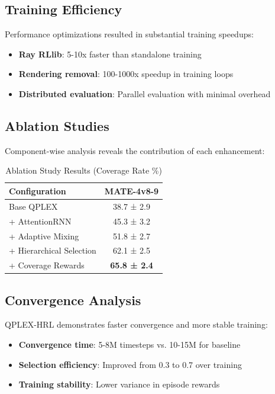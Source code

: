 \documentclass[conference]{IEEEtran}
\begin{document}
\subsection{Training Efficiency}
Performance optimizations resulted in substantial training speedups:

\begin{itemize}
\item \textbf{Ray RLlib}: 5-10x faster than standalone training
\item \textbf{Rendering removal}: 100-1000x speedup in training loops
\item \textbf{Distributed evaluation}: Parallel evaluation with minimal overhead
\end{itemize}

\subsection{Ablation Studies}
Component-wise analysis reveals the contribution of each enhancement:

\begin{table}[h]
\centering
\caption{Ablation Study Results (Coverage Rate \%)}
\begin{tabular}{lc}
\toprule
Configuration & MATE-4v8-9 \\
\midrule
Base QPLEX & 38.7 ± 2.9 \\
+ AttentionRNN & 45.3 ± 3.2 \\
+ Adaptive Mixing & 51.8 ± 2.7 \\
+ Hierarchical Selection & 62.1 ± 2.5 \\
+ Coverage Rewards & \textbf{65.8 ± 2.4} \\
\bottomrule
\end{tabular}
\end{table}

\subsection{Convergence Analysis}
QPLEX-HRL demonstrates faster convergence and more stable training:
\begin{itemize}
\item \textbf{Convergence time}: 5-8M timesteps vs. 10-15M for baseline
\item \textbf{Selection efficiency}: Improved from 0.3 to 0.7 over training
\item \textbf{Training stability}: Lower variance in episode rewards
\end{itemize}
\end{document}
